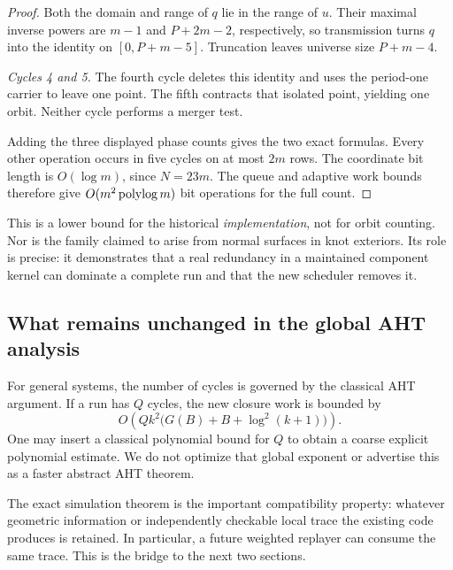 \begin{proof}
Both the domain and range of \(q\) lie in the range of \(u\).
Their maximal inverse powers are \(m-1\) and \(P+2m-2\),
respectively, so transmission turns \(q\) into the identity on
\([0,P+m-5]\). Truncation leaves universe size \(P+m-4\).

\emph{Cycles 4 and 5.}
The fourth cycle deletes this identity and uses the period-one carrier
to leave one point. The fifth contracts that isolated point, yielding
one orbit. Neither cycle performs a merger test.

Adding the three displayed phase counts gives the two exact formulas.
Every other operation occurs in five cycles on at most \(2m\) rows.
The coordinate bit length is \(O(\log m)\), since \(N=23m\).
The queue and adaptive work bounds therefore give
\(O(m^2\operatorname{polylog} m)\) bit operations for the full count.
\end{proof}

This is a lower bound for the historical \emph{implementation}, not for
orbit counting. Nor is the family claimed to arise from normal surfaces
in knot exteriors. Its role is precise: it demonstrates that a real
redundancy in a maintained component kernel can dominate a complete
run and that the new scheduler removes it.

\subsection{What remains unchanged in the global AHT analysis}

For general systems, the number of cycles is governed by the classical
AHT argument. If a run has \(Q\) cycles, the new closure work is bounded by
\[
 O\!\left(Q k^2\bigl(G(B)+B+\log^2(k+1)\bigr)\right).
\]
One may insert a classical polynomial bound for \(Q\) to obtain a coarse
explicit polynomial estimate. We do not optimize that global exponent
or advertise this as a faster abstract AHT theorem.

The exact simulation theorem is the important compatibility property:
whatever geometric information or independently checkable local trace the
existing code produces is retained. In particular, a future weighted
replayer can consume the same trace. This is the bridge to the next two
sections.

